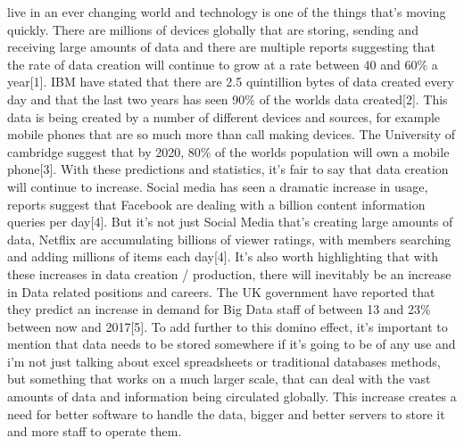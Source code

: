 \documentclass[10pt,journal,compsoc]{IEEEtran}
\begin{document}
 live in an ever changing world and technology is one of the things that's moving quickly. There are millions of devices globally that are storing, sending and receiving large amounts of data and there are multiple reports suggesting that the rate of data creation will continue to grow at a rate between 40 and 60\% a year[1]. IBM have stated that there are 2.5 quintillion bytes of data created every day and that the last two years has seen 90\% of the worlds data created[2]. This data is being created by a number of different devices and sources, for example mobile phones that are so much more than call making devices. The University of cambridge suggest that by 2020, 80\% of the worlds population will own a mobile phone[3]. With these predictions and statistics, it's fair to say that data creation will continue to increase. Social media has seen a dramatic increase in usage, reports suggest that Facebook are dealing with a billion content information queries per day[4]. But it's not just Social Media that's creating large amounts of data, Netflix are accumulating billions of viewer ratings, with members searching and adding millions of items each day[4]. It's also worth highlighting that with these increases in data creation / production, there will inevitably be an increase in Data related positions and careers. The UK government have reported that they predict an increase in demand for Big Data staff of between 13 and 23\% between now and 2017[5]. To add further to this domino effect, it's important to mention that data needs to be stored somewhere if it's going to be of any use and i'm not just talking about excel spreadsheets or traditional databases methods, but something that works on a much larger scale, that can deal with the vast amounts of data and information being circulated globally. This increase creates a need for better software to handle the data, bigger and better servers to store it and more staff to operate them. 

\end{document}

